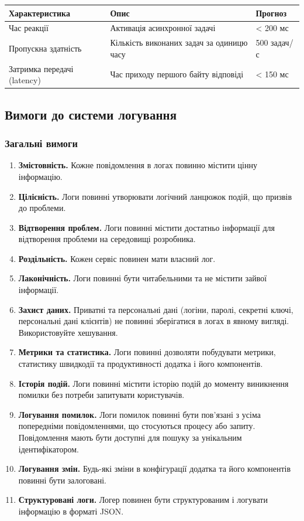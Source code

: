 \documentclass{article}
\begin{document}
\begin{center}
\begin{tabular}{l l l}
\toprule
\textbf{Характеристика} & \textbf{Опис} & \textbf{Прогноз} \\
\midrule
Час реакції & Активація асинхронної задачі & \textless{} 200 мс \\
Пропускна здатність & Кількість виконаних задач за одиницю часу & 500 задач/с \\
Затримка передачі (latency) & Час приходу першого байту відповіді & \textless{} 150 мс \\
\bottomrule
\end{tabular}
\end{center}

\newpage
\subsection{Вимоги до системи логування}

\subsubsection{Загальні вимоги}

\begin{enumerate}
    \item \textbf{Змістовність.} Кожне повідомлення в логах повинно містити цінну інформацію.
    \item \textbf{Цілісність.} Логи повинні утворювати логічний ланцюжок подій, що призвів до проблеми.
    \item \textbf{Відтворення проблем.} Логи повинні містити достатньо інформації для відтворення проблеми на середовищі розробника.
    \item \textbf{Роздільність.} Кожен сервіс повинен мати власний лог.
    \item \textbf{Лаконічність.} Логи повинні бути читабельними та не містити зайвої інформації.
    \item \textbf{Захист даних.} Приватні та персональні дані (логіни, паролі, секретні ключі, персональні дані клієнтів) не повинні зберігатися в логах в явному вигляді. Використовуйте хешування.
    \item \textbf{Метрики та статистика.} Логи повинні дозволяти побудувати метрики, статистику швидкодії та продуктивності додатка і його компонентів.
    \item \textbf{Історія подій.} Логи повинні містити історію подій до моменту виникнення помилки без потреби запитувати користувачів.
    \item \textbf{Логування помилок.} Логи помилок повинні бути пов’язані з усіма попередніми повідомленнями, що стосуються процесу або запиту. Повідомлення мають бути доступні для пошуку за унікальним ідентифікатором.
    \item \textbf{Логування змін.} Будь-які зміни в конфігурації додатка та його компонентів повинні бути залоговані.
    \item \textbf{Структуровані логи.} Логер повинен бути структурованим і логувати інформацію в форматі JSON.
\end{enumerate}
\end{document}
